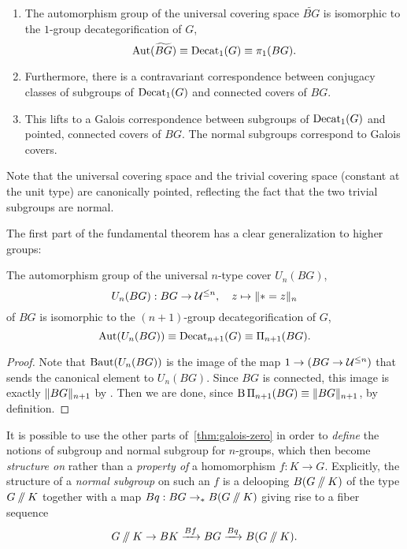 \begin{thm}
  \label{thm:galois-zero}
  $\phantom{42}$
  \begin{enumerate}
  \item  The automorphism group of the universal covering space
    $\widetilde{BG}$ is isomorphic to
    the $1$-group decategorification of $G$,
    \[
      \Aut(\widetilde{BG}) \equiv \Decat_1(G) \equiv \pi_1(BG).
    \]
  \item Furthermore, there is a contravariant correspondence between
    conjugacy classes of subgroups of $\Decat_1(G)$ and connected
    covers of $BG$.
  \item This lifts to a Galois correspondence between subgroups of
    $\Decat_1(G)$ and pointed, connected covers of $BG$.  The normal
    subgroups correspond to Galois covers.
  \end{enumerate}
\end{thm}
Note that the universal covering space
and the trivial covering space
(constant at the unit type)
are canonically pointed,
reflecting the fact that
the two trivial subgroups are normal.

The first part of the fundamental theorem has a clear generalization to
higher groups:
\begin{thm}
  The automorphism group of the universal $n$-type cover $U_n(BG)$,
  \[
    U_n(BG) : BG \to \UU^{\le n},
    \quad
    z \mapsto \trunc{n}{\pt = z}
  \]
  of $BG$ is
  isomorphic to the $(n+1)$-group decategorification of $G$,
  \[
    \Aut(U_n(BG)) \equiv \Decat_{n+1}(G) \equiv \Pi_{n+1}(BG).
  \]
\end{thm}
\begin{proof}
  Note that
  $\BAut(U_n(BG))$ is the image of the map $1 \to (BG \to \UU^{\le
    n})$ that sends the canonical element to $U_n(BG)$. Since $BG$ is
  connected, this image is exactly $\trunc{n+1}{BG}$ by
  \cite[Theorem~7.1]{joinconstruction}. Then we are done,
  since $\B\Pi_{n+1}(BG) \equiv \trunc{n+1}{BG}$, by definition.
\end{proof}
It is possible to use the other parts
of~\autoref{thm:galois-zero} in order to \emph{define} the notions of
subgroup and normal subgroup for $n$-groups, which then become
\emph{structure on} rather than a \emph{property of} a homomorphism $f
: K \to G$.
Explicitly, the structure of a \emph{normal subgroup} on such an $f$
is a delooping $B(G \dblslash K)$ of the type $G \dblslash K$
together with a map $Bq : BG \to_\pt B(G \dblslash K)$ giving rise to a
fiber sequence
\begin{equation}\label{eq:normal-fiber-sequence}
  G \dblslash K \to BK \xrightarrow{Bf}{} BG
  \xrightarrow{Bq}{} B(G \dblslash K).
\end{equation}

